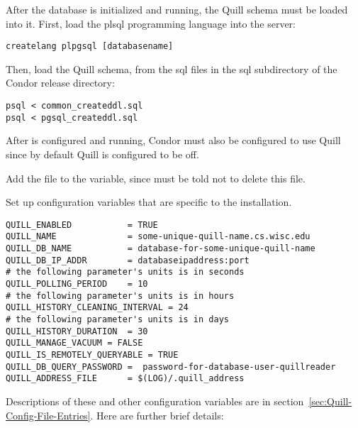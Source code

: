 After the  database is initialized and running, 
the Quill schema
must be loaded into it.  First, load the plsql programming language
into the server:

\begin{verbatim}
createlang plpgsql [databasename]
\end{verbatim}

Then, load the Quill schema, from the sql files in the sql subdirectory
of the Condor release directory:

\begin{verbatim}
psql < common_createddl.sql
psql < pgsql_createddl.sql
\end{verbatim}


After  is configured and running, Condor must also be
configured to use Quill since by default Quill is configured to be off.

\begin{description}
\item Add the file  to the 
   variable, since  must
  be told not to delete this file.
\item Set up configuration variables that are specific
  to the installation.
\footnotesize
\begin{verbatim}
QUILL_ENABLED           = TRUE
QUILL_NAME              = some-unique-quill-name.cs.wisc.edu
QUILL_DB_NAME           = database-for-some-unique-quill-name
QUILL_DB_IP_ADDR        = databaseipaddress:port
# the following parameter's units is in seconds
QUILL_POLLING_PERIOD    = 10
# the following parameter's units is in hours
QUILL_HISTORY_CLEANING_INTERVAL = 24
# the following parameter's units is in days
QUILL_HISTORY_DURATION 	= 30
QUILL_MANAGE_VACUUM = FALSE
QUILL_IS_REMOTELY_QUERYABLE = TRUE
QUILL_DB_QUERY_PASSWORD =  password-for-database-user-quillreader
QUILL_ADDRESS_FILE      = $(LOG)/.quill_address
\end{verbatim}
\normalsize

\end{description}


Descriptions of these and other configuration variables are in
section~\ref{sec:Quill-Config-File-Entries}.
Here are further brief details:

